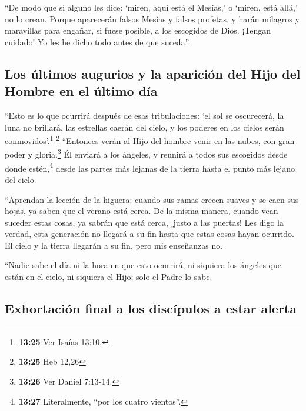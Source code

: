  ``De modo que si alguno les dice: `miren, aquí está el
Mesías,' o `miren, está allá,' no lo crean.  Porque
aparecerán falsos Mesías y falsos profetas, y harán milagros y
maravillas para engañar, si fuese posible, a los escogidos de Dios.
 ¡Tengan cuidado! Yo les he dicho todo antes de que
suceda''.

\hypertarget{los-uxfaltimos-augurios-y-la-apariciuxf3n-del-hijo-del-hombre-en-el-uxfaltimo-duxeda}{%
\subsection{Los últimos augurios y la aparición del Hijo del Hombre en
el último
día}\label{los-uxfaltimos-augurios-y-la-apariciuxf3n-del-hijo-del-hombre-en-el-uxfaltimo-duxeda}}

 ``Esto es lo que ocurrirá después de esas tribulaciones:
`el sol se oscurecerá, la luna no brillará,  las
estrellas caerán del cielo, y los poderes en los cielos serán
conmovidos'.\footnote{\textbf{13:25} Ver Isaías 13:10.} \footnote{\textbf{13:25}
  Heb 12,26}  ``Entonces verán al Hijo del hombre venir
en las nubes, con gran poder y gloria.\footnote{\textbf{13:26} Ver
  Daniel 7:13-14.}  Él enviará a los ángeles, y reunirá a
todos sus escogidos desde donde estén,\footnote{\textbf{13:27}
  Literalmente, ``por los cuatro vientos''.} desde las partes más
lejanas de la tierra hasta el punto más lejano del cielo.

 ``Aprendan la lección de la higuera: cuando sus ramas
crecen suaves y se caen sus hojas, ya saben que el verano está cerca.
 De la misma manera, cuando vean suceder estas cosas, ya
sabrán que está cerca, ¡justo a las puertas!  Les digo la
verdad, esta generación no llegará a su fin hasta que estas cosas hayan
ocurrido.  El cielo y la tierra llegarán a su fin, pero
mis enseñanzas no.

 ``Nadie sabe el día ni la hora en que esto ocurrirá, ni
siquiera los ángeles que están en el cielo, ni siquiera el Hijo; solo el
Padre lo sabe.

\hypertarget{exhortaciuxf3n-final-a-los-discuxedpulos-a-estar-alerta}{%
\subsection{Exhortación final a los discípulos a estar
alerta}\label{exhortaciuxf3n-final-a-los-discuxedpulos-a-estar-alerta}}

